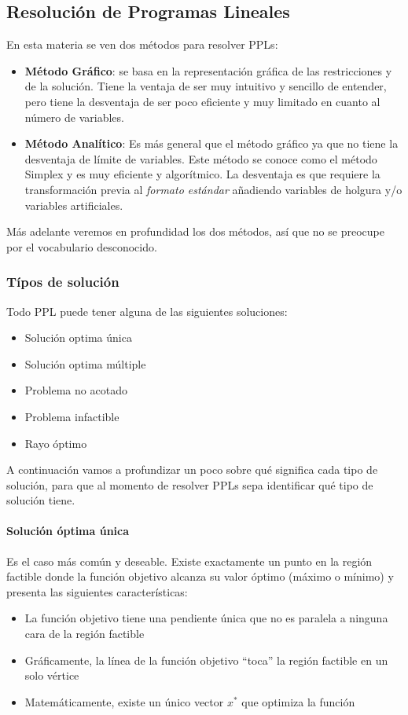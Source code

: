 \subsection{Resolución de Programas Lineales}

En esta materia se ven dos métodos para resolver PPLs:
\begin{itemize}
  \item \textbf{Método Gráfico}: se basa en la representación gráfica de las restricciones y de la solución. Tiene la ventaja de ser muy intuitivo y sencillo de entender, pero tiene la desventaja de ser poco eficiente y muy limitado en cuanto al número de variables.
  \item \textbf{Método Analítico}: Es más general que el método gráfico ya que no tiene la desventaja de límite de variables. Este método se conoce como el método Simplex y es muy eficiente y algorítmico. La desventaja es que requiere la transformación previa al \textit{formato estándar} añadiendo variables de holgura y/o variables artificiales.
\end{itemize}
Más adelante veremos en profundidad los dos métodos, así que no se preocupe por el vocabulario desconocido.

\subsubsection{Típos de solución}

Todo PPL puede tener alguna de las siguientes soluciones:
\begin{itemize}
  \item Solución optima única
  \item Solución optima múltiple
  \item Problema no acotado
  \item Problema infactible
  \item Rayo óptimo
\end{itemize}

A continuación vamos a profundizar un poco sobre qué significa cada tipo de solución, para que al momento de resolver PPLs sepa identificar qué tipo de solución tiene.

\paragraph{Solución óptima única}

\noindent Es el caso más común y deseable. Existe exactamente un punto en la región factible donde la función objetivo alcanza su valor óptimo (máximo o mínimo) y presenta las siguientes características:
\begin{itemize}
  \item La función objetivo tiene una pendiente única que no es paralela a ninguna cara de la región factible
  \item Gráficamente, la línea de la función objetivo ``toca'' la región factible en un solo vértice
  \item Matemáticamente, existe un único vector \(x^*\) que optimiza la función
\end{itemize}

